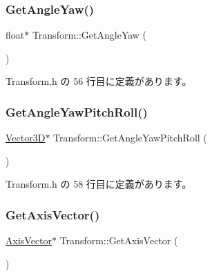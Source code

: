 \subsubsection{\texorpdfstring{Get\+Angle\+Yaw()}{GetAngleYaw()}}
{\footnotesize\ttfamily float$\ast$ Transform\+::\+Get\+Angle\+Yaw (\begin{DoxyParamCaption}{ }\end{DoxyParamCaption})\hspace{0.3cm}{\ttfamily [inline]}}



 Transform.\+h の 56 行目に定義があります。

\mbox{\label{class_transform_a1bd5cddc216e7fafe12e5b605cb780ea}} 
\subsubsection{\texorpdfstring{Get\+Angle\+Yaw\+Pitch\+Roll()}{GetAngleYawPitchRoll()}}
{\footnotesize\ttfamily \mbox{\hyperlink{class_vector3_d}{Vector3D}}$\ast$ Transform\+::\+Get\+Angle\+Yaw\+Pitch\+Roll (\begin{DoxyParamCaption}{ }\end{DoxyParamCaption})\hspace{0.3cm}{\ttfamily [inline]}}



 Transform.\+h の 58 行目に定義があります。

\mbox{\label{class_transform_ad300be34dddc6109ca142452e65aa77d}} 
\subsubsection{\texorpdfstring{Get\+Axis\+Vector()}{GetAxisVector()}}
{\footnotesize\ttfamily \mbox{\hyperlink{class_axis_vector}{Axis\+Vector}}$\ast$ Transform\+::\+Get\+Axis\+Vector (\begin{DoxyParamCaption}{ }\end{DoxyParamCaption})\hspace{0.3cm}{\ttfamily [inline]}}



